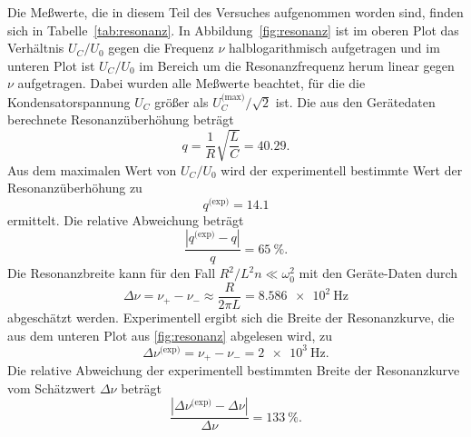 Die Meßwerte, die in diesem Teil des Versuches aufgenommen worden sind,
finden sich in Tabelle~\ref{tab:resonanz}. In
Abbildung~\ref{fig:resonanz} ist im oberen Plot das Verhältnis $U_C/U_0$
gegen die Frequenz $\nu$ halblogarithmisch aufgetragen und im unteren
Plot ist $U_C/U_0$ im Bereich um die Resonanzfrequenz herum linear gegen
$\nu$ aufgetragen. Dabei wurden alle Meßwerte beachtet, für die die
Kondensatorspannung $U_C$ größer als $U_C^\text{(max)}/\sqrt{2}$
ist. Die aus den Gerätedaten berechnete Resonanzüberhöhung beträgt
%
\begin{equation*}
  q = \frac{1}{R} \sqrt{\frac{L}{C}} = \num{40.29}.
\end{equation*}
%
Aus dem maximalen Wert von $U_C/U_0$ wird der experimentell bestimmte
Wert der Resonanzüberhöhung zu
%
\begin{equation*}
  q^\text{(exp)} = \num{14.1}
\end{equation*}
%
ermittelt. Die relative Abweichung beträgt
%
\begin{equation*}
  \frac{|q^\text{(exp)} - q|}{q} = \SI{65}{\percent}.
\end{equation*}
Die Resonanzbreite kann für den Fall $R^2/L^2n \ll \omega_0^2$ mit den
Geräte-Daten durch
%
\begin{equation*}
  \Delta\nu = \nu_+ - \nu_- \approx \frac{R}{2\pi L} 
  = \SI{8.586e2}{\hertz}
\end{equation*}
abgeschätzt werden. Experimentell ergibt sich die Breite der
Resonanzkurve, die aus dem unteren Plot aus \cref{fig:resonanz}
abgelesen wird, zu
%
\begin{equation*}
  \Delta\nu^\text{(exp)} = \nu_+ - \nu_- = \SI{2e3}{\hertz}.
\end{equation*}
Die relative Abweichung der experimentell bestimmten Breite der
Resonanzkurve vom Schätzwert $\Delta\nu$ beträgt
%
\begin{equation*}
  \frac{|\Delta\nu^\text{(exp)} - \Delta\nu|}{\Delta\nu} 
  = \SI{133}{\percent}.
\end{equation*}

